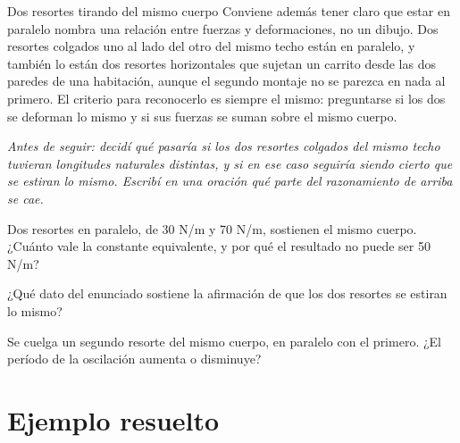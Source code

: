 \documentclass[11pt,openany]{book}
\begin{document}
\begin{bloque}{Dos resortes tirando del mismo cuerpo}
Conviene además tener claro que estar en paralelo nombra una relación entre fuerzas y deformaciones, no un dibujo. Dos resortes colgados uno al lado del otro del mismo techo están en paralelo, y también lo están dos resortes horizontales que sujetan un carrito desde las dos paredes de una habitación, aunque el segundo montaje no se parezca en nada al primero. El criterio para reconocerlo es siempre el mismo: preguntarse si los dos se deforman lo mismo y si sus fuerzas se suman sobre el mismo cuerpo.

\textit{Antes de seguir: decidí qué pasaría si los dos resortes colgados del mismo techo tuvieran longitudes naturales distintas, y si en ese caso seguiría siendo cierto que se estiran lo mismo. Escribí en una oración qué parte del razonamiento de arriba se cae.}
\end{bloque}

\begin{chequeo}
\item Dos resortes en paralelo, de 30 N/m y 70 N/m, sostienen el mismo cuerpo. ¿Cuánto vale la constante equivalente, y por qué el resultado no puede ser 50 N/m?
\item ¿Qué dato del enunciado sostiene la afirmación de que los dos resortes se estiran lo mismo?
\item Se cuelga un segundo resorte del mismo cuerpo, en paralelo con el primero. ¿El período de la oscilación aumenta o disminuye?
\end{chequeo}

\section{Ejemplo resuelto}
\end{document}
